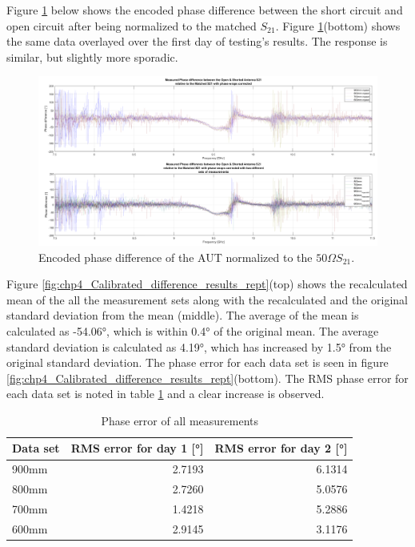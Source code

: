 Figure \ref{fig:chp4_Calibrated_difference_rept_results} below shows the encoded phase difference between the short circuit and open circuit after being normalized to the matched \(S_{21}\). Figure  \ref{fig:chp4_Calibrated_difference_rept_results}(bottom) shows the same data overlayed over the first day of testing’s results. The response is similar, but slightly more sporadic.

    \begin{figure}[H]
    \centering
    \includegraphics[width=0.99\linewidth]{Figures/chp4_Calibrated_difference_rept_results.png}
    \caption{Encoded phase difference of the AUT normalized to the \(50\Omega S_{21}\).}
    \label{fig:chp4_Calibrated_difference_rept_results}
    \end{figure}

Figure \ref{fig:chp4_Calibrated_difference_results_rept}(top) shows the recalculated mean of the all the measurement sets along with the recalculated and the original standard deviation from the mean (middle). The average of the mean is calculated as -54.06°, which is within 0.4° of the original mean. The average standard deviation is calculated as 4.19°, which has increased by 1.5° from the original standard deviation. The phase error for each data set is seen in figure \ref{fig:chp4_Calibrated_difference_results_rept}(bottom). The RMS phase error for each data set is noted in table \ref{tab:errorDay2} and a clear increase is observed.

    \begin{table}[H]
    \centering
    \caption{Phase error of all measurements}
    \begin{tabular}{|l|r|r|} 
    \hline
    \textbf{Data set} & \textbf{RMS error for day 1 [°]} & \textbf{RMS error for day 2 [°]}  \\ 
    \hline
    900mm                 & 2.7193    & 6.1314    \\ 
    \hline 
    800mm                 & 2.7260    & 5.0576 \\
    \hline
    700mm                 & 1.4218    & 5.2886  \\
    \hline
    600mm                 & 2.9145    & 3.1176  \\
    \hline
    \end{tabular}
    \label{tab:errorDay2}
    \end{table}

